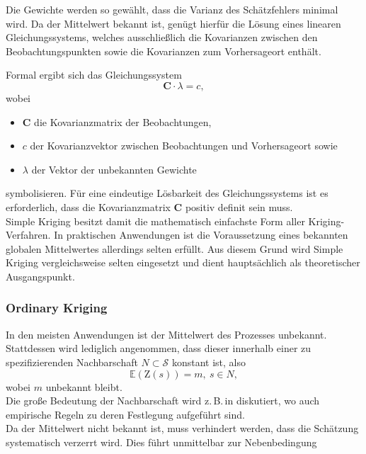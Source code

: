 Die Gewichte werden so gewählt, dass die Varianz des Schätzfehlers minimal wird. 
Da der Mittelwert bekannt ist, genügt hierfür die Lösung eines linearen Gleichungssystems, 
welches ausschließlich die Kovarianzen zwischen den Beobachtungspunkten sowie 
die Kovarianzen zum Vorhersageort enthält.

Formal ergibt sich das Gleichungssystem
\begin{equation}
\mathbf{C}\cdot \lambda = c,
\end{equation}
wobei

\begin{itemize}[topsep=2pt,parsep=1pt,itemsep=0.5pt]
\item[$\circ$] $\mathbf{C}$ die Kovarianzmatrix der Beobachtungen,
\item[$\circ$] $c$ der Kovarianzvektor zwischen Beobachtungen 
und Vorhersageort sowie
\item[$\circ$] $\lambda$ der Vektor der unbekannten Gewichte
\end{itemize}
symbolisieren. Für eine eindeutige Lösbarkeit des
Gleichungssystems ist es erforderlich, dass die Kovarianzmatrix $\mathbf{C}$ positiv definit sein muss.\\

Simple Kriging besitzt damit die mathematisch einfachste Form aller Kriging-Verfahren. 
In praktischen Anwendungen ist die Voraussetzung eines bekannten globalen 
Mittelwertes allerdings selten erfüllt. Aus diesem Grund wird Simple Kriging 
vergleichsweise selten eingesetzt und dient hauptsächlich als 
theoretischer Ausgangspunkt.

\subsubsection{Ordinary Kriging}
\label{KapitelTheorie_OrdinaryKriging}
In den meisten Anwendungen ist der Mittelwert des Prozesses unbekannt. 
Stattdessen wird lediglich angenommen, dass dieser innerhalb einer zu
spezifizierenden Nachbarschaft $N\subset \mathcal{S}$ konstant ist, also
\begin{equation}
\mathbb{E}\left( \mathrm{Z}(s) \right) = m,\ s \in N,
\end{equation}
wobei $m$ unbekannt bleibt.\\
Die große Bedeutung der
Nachbarschaft wird z.\,B.\,in \cite[Kap.\,8.5]{Webster2007} 
diskutiert, wo auch empirische Regeln zu deren Festlegung 
aufgeführt sind. \\
Da der Mittelwert nicht bekannt ist, muss verhindert werden, dass die 
Schätzung systematisch verzerrt wird. Dies führt unmittelbar zur 
Nebenbedingung

